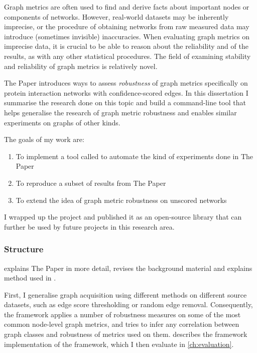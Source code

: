 Graph metrics are often used to find and derive facts about important nodes or components of networks.
However, real-world datasets may be inherently imprecise, or the procedure of obtaining networks from raw measured data may introduce (sometimes invisible) inaccuracies.
When evaluating graph metrics on imprecise data, it is crucial to be able to reason about the reliability and of the results, as with any other statistical procedures.
The field of examining stability and reliability of graph metrics is relatively novel.

The Paper introduces ways to assess \textsl{robustness} of graph metrics specifically on protein interaction networks with confidence-scored edges.
In this dissertation I summarise the research done on this topic and build a command-line tool that helps generalise the research of graph metric robustness and enables similar experiments on graphs of other kinds.

The goals of my work are:
\begin{enumerate}
    \item To implement a tool called \graffs to automate the kind of experiments done in The Paper
    \item To reproduce a subset of results from The Paper
    \item To extend the idea of graph metric robustness on unscored networks
\end{enumerate}

I wrapped up the project and published it as an open-source library that can further be used by future projects in this research area.

\subsubsection*{Structure}


 explains The Paper in more detail, revises the background material and explains method used in \graffs.

First, I generalise graph acquisition using different methods on different source datasets, such as edge score thresholding or random edge removal.
Consequently, the framework applies a number of robustness measures on some of the most common node-level graph metrics, and tries to infer any correlation between graph classes and robustness of metrics used on them.
 describes the framework implementation of the framework, which I then evaluate in \cref{ch:evaluation}.


